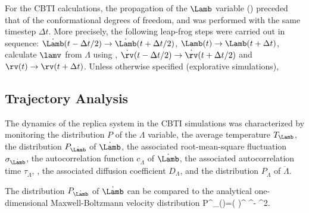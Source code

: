 For the CBTI calculations, the propagation of the $\Lamb$ variable
() preceded that 
of the conformational degrees of freedom, and was performed with the same 
timestep $\Delta t$.
%
More precisely, the following 
leap-frog steps were carried out in sequence:
$\dot{\Lamb}(t-\Delta t/2) \rightarrow \dot{\Lamb}(t+\Delta t/2)$,
$\Lamb(t) \rightarrow \Lamb(t+\Delta t)$,
calculate $\lamv$ from $\Lambda$ using ,
$\dot{\rv}(t-\Delta t/2) \rightarrow \dot{\rv}(t+\Delta t/2)$
and
$\rv(t) \rightarrow \rv(t+\Delta t)$.
%
Unless otherwise specified (explorative simulations), 


\subsection{Trajectory Analysis}

The dynamics of the replica system in the CBTI simulations was characterized by monitoring
the distribution $P$ of the $\Lambda$ variable,
the average temperature $T_{\Lamb}$, 
the distribution $P_{\dot{\Lamb}}$ of $\dot{\Lamb}$, 
the associated root-mean-square fluctuation $\sigma_{\dot{\Lamb}}$, 
the  autocorrelation function $c_{\dot{\Lambda}}$ of $\dot{\Lamb}$, 
the associated autocorrelation time $\tau_{\dot{\Lambda}}$, 
,
the associated diffusion coefficient $D_{\Lambda}$, 
and 
the distribution $P_{\ddot{\Lambda}}$ of $\ddot{\Lambda}$.
%
%
%


The distribution $P_{\dot{\Lamb}}$ of $\dot{\Lamb}$ can be compared to the analytical one-dimensional Maxwell-Boltzmann velocity distribution\cite{MA60.1}
%
P^{}_{\dot{\Lamb}}(\dot{\Lamb})=\left (  \right )^{} ^{- \dot{\Lamb}^2}.
\eeq
%


